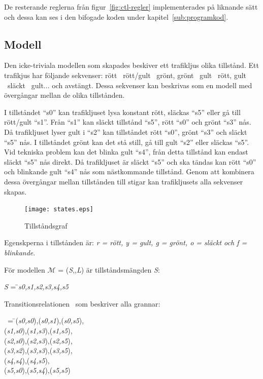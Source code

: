 De resterande reglerna från figur~\ref{fig:ctl-regler} implementerades på liknande sätt och dessa kan ses i den bifogade koden under kapitel~\ref{sub:programkod}.

\subsection{Modell}\label{sub:modell}

Den icke-triviala modellen som skapades beskiver ett trafikljus olika tillstånd. Ett trafikjus har följande sekvenser: rött \textrightarrow\ rött/gult \textrightarrow\ grönt, grönt \textrightarrow\ gult \textrightarrow\ rött, gult \textrightarrow\ släckt  \textrightarrow\ gult... och avstängt. Dessa sekvenser kan beskrivas som en modell med övergångar mellan de olika tillstånden.

I tillståndet “s0” kan trafikljuset lysa konstant rött, släckas “s5” eller gå till rött/gult “s1”. Från “s1” kan släckt tillstånd “s5”, rött “s0” och grönt “s3” nås. Då trafikljuset lyser gult i “s2” kan tillståndet rött “s0”, grönt “s3” och släckt “s5” nås. I tillståndet grönt kan det stå still, gå till gult “s2” eller släckas “s5”. Vid tekniska problem kan det blinka gult “s4”, från detta tillstånd kan endast släckt “s5” nås direkt. Då trafikljuset är släckt “s5” och ska tändas kan rött “s0” och blinkande gult “s4” nås som nästkommande tillstånd. Genom att kombinera dessa övergångar mellan tillstånden till stigar kan trafikljusets alla sekvenser skapas.

\begin{figure}[hb]
\texttt{[image: states.eps]}
\caption{Tillståndsgraf}
\label{fig:ctl-states}
\end{figure}

Egenskperna i tillstånden är: \textit{r = rött, y = gult, g = grönt, o = släckt och f = blinkande}.



För modellen $\mathcal{M}$ = (\textit{S},\textrightarrow,\textit{L}) är tillståndsmängden \textit{S}:

\begin{tabbing}
\textit{S} = \= \textbraceleft \textit{s0,s1,s2,s3,s4,s5}\textbraceright\\
\end{tabbing}

Transitionsrelationen \textrightarrow\ som beskriver alla grannar: 
\begin{tabbing}
\textrightarrow\ = \= \textbraceleft (\textit{s0,s0}),(\textit{s0,s1}),(\textit{s0,s5}),\\
\> (\textit{s1,s0}),(\textit{s1,s3}),(\textit{s1,s5}),\\
\> (\textit{s2,s0}),(\textit{s2,s3}),(\textit{s2,s5}),\\
\> (\textit{s3,s2}),(\textit{s3,s3}),(\textit{s3,s5}),\\
\> (\textit{s4,s4}),(\textit{s4,s5}),\\
\> (\textit{s5,s0}),(\textit{s5,s4}),(\textit{s5,s5})\textbraceright\\
\end{tabbing}

